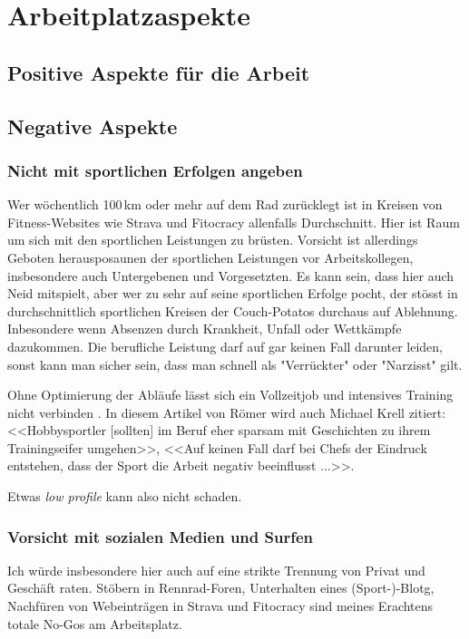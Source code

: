 \chapter{Arbeitplatzaspekte}

\section{Positive Aspekte für die Arbeit}

\section{Negative Aspekte}

\subsection{Nicht mit sportlichen Erfolgen angeben}

Wer wöchentlich 100\,km oder mehr auf dem Rad zurücklegt ist in Kreisen von Fitness-Websites wie Strava und Fitocracy allenfalls Durchschnitt.
Hier ist Raum um sich mit den sportlichen Leistungen zu brüsten.
Vorsicht ist allerdings Geboten herausposaunen der sportlichen Leistungen vor Arbeitskollegen, insbesondere auch Untergebenen und Vorgesetzten.
Es kann sein, dass hier auch Neid mitspielt, aber wer zu sehr auf seine sportlichen Erfolge pocht,
der stösst in durchschnittlich sportlichen Kreisen der Couch-Potatos durchaus auf Ablehnung.
Inbesondere wenn Absenzen durch Krankheit, Unfall oder Wettkämpfe dazukommen.
Die berufliche Leistung darf auf gar keinen Fall darunter leiden, sonst kann man sicher sein, dass man schnell als "Verrückter" oder "Narzisst" gilt.

Ohne Optimierung der Abläufe lässt sich ein Vollzeitjob und intensives Training nicht verbinden \cite{Roemer2014ironmanvollzeitjob}.
In diesem Artikel von Römer wird auch Michael Krell zitiert: <<Hobbysportler [sollten] im Beruf eher sparsam mit Geschichten zu ihrem Trainingseifer umgehen>>,
<<Auf keinen Fall darf bei Chefs der Eindruck entstehen, dass der Sport die Arbeit negativ beeinflusst ...>>.

Etwas \emph{low profile} kann also nicht schaden.

\subsection{Vorsicht mit sozialen Medien und Surfen}

Ich würde insbesondere hier auch auf eine strikte Trennung von Privat und Geschäft raten.
Stöbern in Rennrad-Foren, Unterhalten eines (Sport-)-Blotg, Nachfüren von Webeinträgen in Strava und Fitocracy sind meines Erachtens totale No-Gos am Arbeitsplatz.


